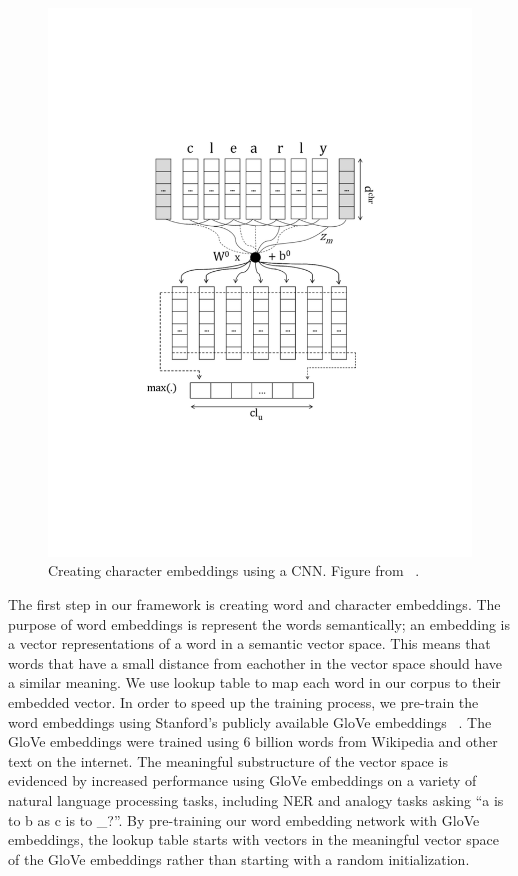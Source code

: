\begin{figure}[h]
\begin{minipage}[t]{0.5\textwidth}
    	\includegraphics[width=.95\linewidth]{LatexDiss/figures/character-CNN.pdf}
    	\caption{Creating character embeddings using a CNN. Figure from ~\citep{characterembeddings}.}
    	\label{fig:CNN}
    \end{minipage}
\end{figure}

The first step in our framework is creating word and character embeddings. The purpose of word embeddings is represent the words semantically; an embedding is a vector representations of a word in a semantic vector space. This means that words that have a small distance from eachother in the vector space should have a similar meaning. We use lookup table to map each word in our corpus to their embedded vector. In order to speed up the training process, we pre-train the word embeddings using Stanford's publicly available GloVe embeddings ~\citep{Pennington2014GloveGV}. The GloVe embeddings were trained using 6 billion words from Wikipedia and other text on the internet. The meaningful substructure of the vector space is evidenced by increased performance using GloVe embeddings on a variety of natural language processing tasks, including NER and analogy tasks asking ``a is to b as c is to \_?''. By pre-training our word embedding network with GloVe embeddings, the lookup table starts with vectors in the meaningful vector space of the GloVe embeddings rather than starting with a random initialization.

